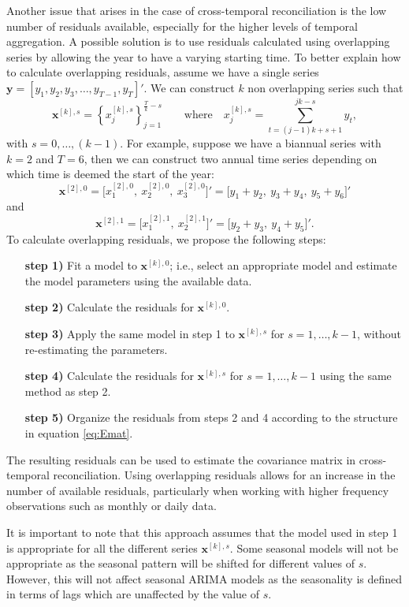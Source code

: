 \documentclass[a4paper,11pt]{article}
\newcommand{\xvet}{\bm{x}}
\newcommand{\yvet}{\bm{y}}
\theoremstyle{definition}
\begin{document}
Another issue that arises in the case of cross-temporal reconciliation is the low number of residuals available, especially for the higher levels of temporal aggregation. A possible solution is to use residuals calculated using overlapping series by allowing the year to have a varying starting time. To better explain how to calculate overlapping residuals, assume we have a single series
$\yvet = [y_1, y_2, y_3, \dots, y_{T-1}, y_{T}]'$. We can construct $k$ non overlapping series such that
$$
	\xvet^{[k], s} = \left\{x^{[k],s}_{j}\right\}_{j = 1}^{\frac{T}{k}-s} \qquad \mathrm{where} \quad x^{[k],s}_{j} = \sum_{t = (j-1)k+s+1}^{jk-s} y_t,
$$
with $s = 0, \dots, (k-1)$.
For example, suppose we have a biannual series with $k = 2$ and $T = 6$, then we can construct two annual time series depending on which time is deemed the start of the year:
$$
	\xvet^{[2], 0} =  \Big[x_1^{[2], 0},~ x_2^{[2], 0},~ x_{3}^{[2], 0} \Big]' =
										\Big[y_1 + y_2,~ y_3 + y_4,~ y_5 + y_6\Big]'
$$
and
$$
	\xvet^{[2], 1} = \Big[x_1^{[2], 1},~ x_2^{[2], 1} \Big]' =
									 \Big[y_2 + y_3,~  y_4 + y_5 \Big]'.
$$
To calculate overlapping residuals, we propose the following steps:
\begin{itemize}[leftmargin = 2.5cm, nosep]
	\item[\textbf{step 1)}] Fit a model to $\xvet^{[k], 0}$; i.e., select an appropriate model and estimate the model parameters using the available data.
	\item[\textbf{step 2)}] Calculate the residuals for $\xvet^{[k], 0}$.
	\item[\textbf{step 3)}] Apply the same model in step 1 to $\xvet^{[k], s}$ for $s = 1, \dots, k-1$, without re-estimating the parameters.
	\item[\textbf{step 4)}] Calculate the residuals for $\xvet^{[k], s}$ for $s = 1, \dots, k-1$ using the same method as step 2.
	\item[\textbf{step 5)}] Organize the residuals from steps 2 and 4 according to the structure in equation \eqref{eq:Emat}.
\end{itemize}
The resulting residuals can be used to estimate the covariance matrix in cross-temporal reconciliation. Using overlapping residuals allows for an increase in the number of available residuals, particularly when working with higher frequency observations such as monthly or daily data.

It is important to note that this approach assumes that the model used in step 1 is appropriate for all the different series $\xvet^{[k], s}$. Some seasonal models will not be appropriate as the seasonal pattern will be shifted for different values of $s$. However, this will not affect seasonal ARIMA models as the seasonality is defined in terms of lags which are unaffected by the value of $s$.
\end{document}
